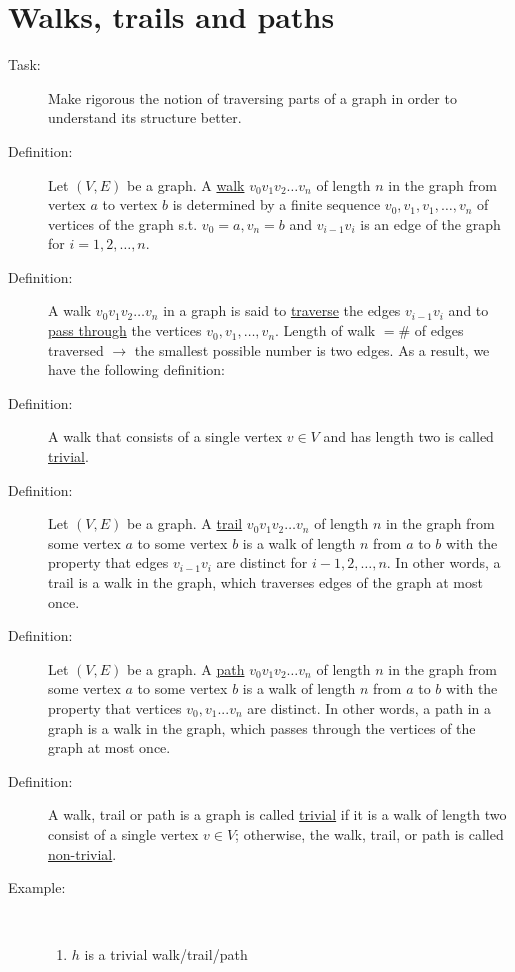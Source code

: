 \documentclass[10pt]{article}
\begin{document}
	\section{Walks, trails and paths}
	\begin{description}
		\item[Task:] Make rigorous the notion of traversing parts of a graph in order to understand its structure better.
		\item[Definition:] Let $(V, E)$ be a graph. A \underline{walk} $v_0 v_1 v_2 \dots v_n$ of length $n$ in the graph from vertex $a$ to vertex $b$ is determined by a finite sequence $v_0, v_1, v_1, \dots, v_n$ of vertices of the graph s.t. $v_0 = a, v_n = b$ and $v_{i-1} v_i$ is an edge of the graph for $i=1, 2, \dots, n$.
		\item[Definition:] A walk $v_0 v_1 v_2 \dots v_n$ in a graph is said to \underline{traverse} the edges $v_{i-1} v_i$ and to \underline{pass through} the vertices $v_0, v_1, \dots, v_n$. Length of walk $= \#$ of edges traversed $\rightarrow$ the smallest possible number is two edges. As a result, we have the following definition:
		\item[Definition:] A walk that consists of a single vertex $v \in V$ and has length two is called \underline{trivial}.
		\item[Definition:] Let $(V, E)$ be a graph. A \underline{trail} $v_0 v_1 v_2 \dots v_n$ of length $n$ in the graph from some vertex $a$ to some vertex $b$ is a walk of length $n$ from $a$ to $b$ with the property that edges $v_{i-1} v_i$ are distinct for $i-1, 2, \dots , n$. In other words, a trail is a walk in the graph, which traverses edges of the graph at most once.
		\item[Definition:] Let $(V, E)$ be a graph. A \underline{path} $v_0 v_1 v_2 \dots v_n$ of length $n$ in the graph from some vertex $a$ to some vertex $b$ is a walk of length $n$ from $a$ to $b$ with the property that vertices $v_0, v_1 ... v_n$ are distinct. In other words, a path in a graph is a walk in the graph, which passes through the vertices of the graph at most once.
		\item[Definition:] A walk, trail or path is a graph is called \underline{trivial} if it is a walk of length two consist of a single vertex $v \in V$; otherwise, the walk, trail, or path is called \underline{non-trivial}.
		\item[Example:] ~\\
		\begin{enumerate}
			\item $h$ is a trivial walk/trail/path

\end{enumerate}
\end{description}
\end{document}
